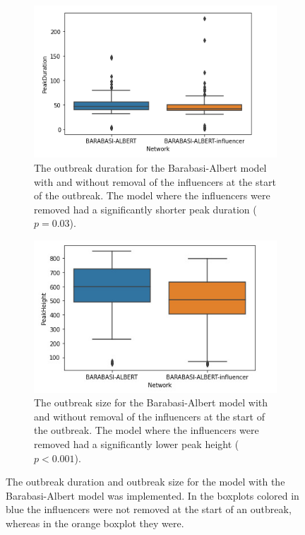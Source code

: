 \documentclass[10pt]{article}
\begin{document}
    \begin{figure}[b!]
        \centering
        \begin{subfigure}[b]{.45\linewidth}
            \includegraphics[width=\textwidth]{pictures/Results/influencer_removal_duration.jpg}
            \caption{The outbreak duration for the Barabasi-Albert model with and without removal of the influencers at the start of the outbreak. The model where the influencers were removed had a significantly shorter peak duration ($p= 0.03$).}
            \label{fig:ba_boxb}
        \end{subfigure}
        \begin{subfigure}[b]{.45\linewidth}
            \includegraphics[width=\textwidth]{pictures/Results/influencer_removal.jpg}
            \caption{The outbreak size for the Barabasi-Albert model with and without removal of the influencers at the start of the outbreak. The model where the influencers were removed had a significantly lower peak height ($p < 0.001$).}
            \label{fig:ba_boxa}
        \end{subfigure}
        \captionsetup{width = 0.9\linewidth}
        \caption{The outbreak duration and outbreak size for the model with the Barabasi-Albert model was implemented. In the boxplots colored in blue the influencers were not removed at the start of an outbreak, whereas in the orange boxplot they were.}
        \label{fig:inf_comp}
    \end{figure}
\end{document}
